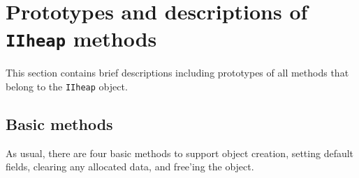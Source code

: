 \par
\section{Prototypes and descriptions of {\tt IIheap} methods}
\label{section:IIheap:proto}
\par
This section contains brief descriptions including prototypes
of all methods that belong to the {\tt IIheap} object.
\par
\subsection{Basic methods}
\label{subsection:IIheap:proto:basics}
\par
As usual, there are four basic methods to support object creation,
setting default fields, clearing any allocated data, and free'ing
the object.
\par
